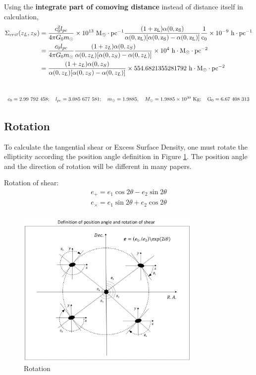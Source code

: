 \documentclass[12pt, a4paper]{article}
\begin{document}
Using the \textbf{integrate part of comoving distance} instead of distance itself in calculation,
\begin{align}
\Sigma_{crit}(z_L, z_S) &= \frac{c_0^2 l_{pc}}{4\pi G_0 m_{\odot}}\times 10^{13} \ \rm{M_{\odot} \cdot pc^{-1}} \frac{(1+z_L)\alpha(0,z_S)}{\alpha(0,z_L)[\alpha(0,z_S) - \alpha(0,z_L)]} \frac{1}{c_0} \times 10^{-9} \ \rm{h \cdot pc^{-1}} \nonumber \\
&=\frac{c_0 l_{pc}}{4\pi G_0 m_{\odot}}\frac{(1+z_L)\alpha(0,z_S)}{\alpha(0,z_L)[\alpha(0,z_S) - \alpha(0,z_L)]}\times 10^4 \ \rm{h \cdot M_{\odot}\cdot pc^{-2}} \nonumber\\
&=\frac{(1+z_L)\alpha(0,z_S)}{\alpha(0,z_L)[\alpha(0,z_S) - \alpha(0,z_L)]}\times 554.6821355281792 \ \rm{h \cdot M_{\odot} \cdot pc^{-2}}
\end{align}
\\

\begin{equation}
c_0 = 2.99\ 792\ 458; \quad  l_{pc} = 3.085\ 677\ 581; \quad m_{\odot} = 1.9885, \quad M_{\odot} = 1.9885\times 10^{30}\  \rm{Kg}; \quad G_0 = 6.67\ 408\ 313 \nonumber
\end{equation}


\subsection{Rotation}
To calculate the tangential shear or Excess Surface Density, one must rotate the ellipticity according the position angle definition in Figure \ref{rotation}. The position angle and the direction of rotation will be different in many papers.

Rotation of shear:
\begin{align}
e_{+} = e_1 \cos 2\theta - e_2 \sin 2\theta \nonumber \\
e_{\times} = e_1 \sin 2\theta + e_2 \cos 2\theta \nonumber \\
\end{align}

\begin{figure}[h]
\centering
\includegraphics[width=0.8\textwidth]{rotation.png}
\caption{Rotation}
\label{rotation}
\end{figure}
\end{document}
